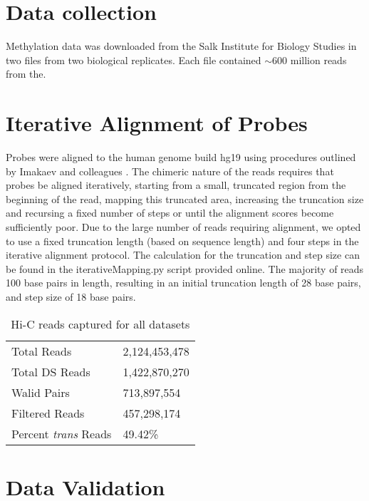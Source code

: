 
\chapter{Data collection}

Methylation data was downloaded from the Salk Institute for Biology Studies in
two files from two biological replicates.  Each file contained $\sim600$ million
reads from the.

\chapter{Iterative Alignment of Probes}

Probes were aligned to the human genome build hg19 using procedures outlined by Imakaev and colleagues \citep{imakaev2012}.  The chimeric nature of the reads
requires that probes be aligned iteratively, starting from a small, truncated region from the beginning of the read, mapping this truncated area, increasing
the truncation size and recursing a fixed number of steps or until the alignment scores become sufficiently poor.  Due to the large number of reads requiring
alignment, we opted to use a fixed truncation length (based on sequence length) and four steps in the iterative alignment protocol.  The calculation
for the truncation and step size can be found in the iterativeMapping.py script provided online.  The majority of reads 100 base pairs in length, resulting
in an initial truncation length of 28 base pairs, and step size of 18 base pairs.

\begin{table}[ht]
  \centering
  \caption{Hi-C reads captured for all datasets}
  \label{tab:reads}
  \begin{tabular}{l l}
    \toprule
    Total Reads                  & 2,124,453,478 \\
    Total DS Reads               & 1,422,870,270 \\
    Walid Pairs                  & 713,897,554 \\
    Filtered Reads               & 457,298,174 \\
    Percent \textit{trans} Reads & 49.42\% \\
    \bottomrule
  \end{tabular}
\end{table}


\chapter{Data Validation}


